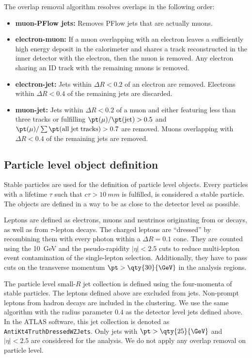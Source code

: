 The overlap removal algorithm resolves overlaps in the following order:
\begin{itemize}
  \item \textbf{muon-PFlow jets:} Removes PFlow jets that are actually muons.
  \item \textbf{electron-muon:} If a muon overlapping with an electron leaves
  a sufficiently high energy deposit in the calorimeter and shares a track
  reconstructed in the inner detector with the electron, then the muon is removed.
  Any electron sharing an ID track with the remaining muons is removed.
  \item \textbf{electron-jet:} Jets within \(\Delta R < 0.2\) of an electron
  are removed. Electrons within \(\Delta R < 0.4\) of the remaining jets are
  discarded.
  \item \textbf{muon-jet:} Jets within \(\Delta R < 0.2\) of a muon
  and either featuring less than three tracks or fulfilling
  \(\pt(\mu) / \pt(\mathrm{jet}) > 0.5\) and
  \(\pt(\mu) / \sum\pt(\mathrm{all\;jet\;tracks}) > 0.7\) are removed.
  Muons overlapping with \(\Delta R < 0.4\) of the remaining jets are removed.
\end{itemize}

\subsection{Particle level object definition}

Stable particles are used for the definition of particle level objects.
Every particles with a lifetime \( \tau \) such that \(c\tau > \qty{10}{mm}\)
is fulfilled, is considered a stable particle.
The objects are defined in a way to be as close to the detector level as possible.

Leptons are defined as electrons, muons and neutrinos originating from \Wboson
or \Zboson decays, as well as from \( \tau \)-lepton decays.
The charged leptons are ``dressed'' by recombining them with every photon
within a \(\Delta R = 0.1\) cone.
They are counted using the \qty{10}{\GeV} and the pseudo-rapidity
\(|\eta| < 2.5\) cuts to reduce multi-lepton event
contamination of the single-lepton selection.
Additionally, they have to pass cuts on the
transverse momentum \(\pt > \qty{30}{\GeV}\) in the analysis regions.

The particle level small-\(R\) jet collection is defined using the four-momenta
of stable particles. The leptons defined above are excluded from jets.
Non-prompt leptons from hadron decays are included in the clustering.
We use the same \antikt algorithm with the radius parameter \(0.4\) as the
detector level jets defined above. In the ATLAS software, this jet collection
is denoted as \texttt{AntiKt4TruthDressedWZJets}.
Only jets with \(\pt > \qty{25}{\GeV}\) and \(|\eta| < 2.5\) are considered
for the analysis. We do not apply any overlap removal on particle level.

